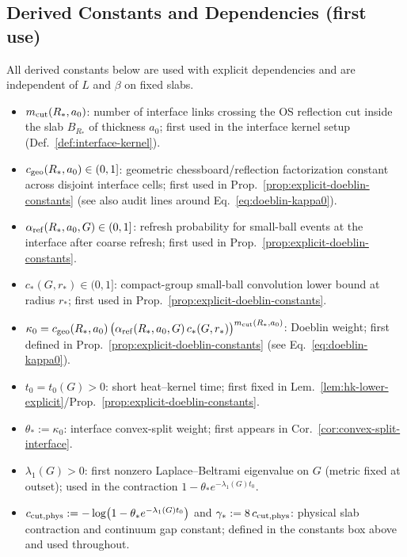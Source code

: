\documentclass[11pt]{amsart}
\theoremstyle{plain}
\theoremstyle{definition}
\theoremstyle{remark}
\begin{document}
\subsection*{Derived Constants and Dependencies (first use)}
All derived constants below are used with explicit dependencies and are independent of $L$ and $\beta$ on fixed slabs.
\begin{itemize}[leftmargin=2em, itemsep=6pt, parsep=3pt]
  \item $m_{\rm cut}(R_*,a_0)$: number of interface links crossing the OS reflection cut inside the slab $B_{R_*}$ of thickness $a_0$; first used in the interface kernel setup (Def.~\ref{def:interface-kernel}).
  \item $c_{\rm geo}(R_*,a_0)\in(0,1]$: geometric chessboard/reflection factorization constant across disjoint interface cells; first used in Prop.~\ref{prop:explicit-doeblin-constants} (see also audit lines around Eq.~\eqref{eq:doeblin-kappa0}).
  \item $\alpha_{\rm ref}(R_*,a_0,G)\in(0,1]$: refresh probability for small-ball events at the interface after coarse refresh; first used in Prop.~\ref{prop:explicit-doeblin-constants}.
  \item $c_*(G,r_*)\in(0,1]$: compact-group small-ball convolution lower bound at radius $r_*$; first used in Prop.~\ref{prop:explicit-doeblin-constants}.
  \item $\kappa_0=c_{\rm geo}(R_*,a_0)\,\big(\alpha_{\rm ref}(R_*,a_0,G)\,c_*(G,r_*)\big)^{m_{\rm cut}(R_*,a_0)}$: Doeblin weight; first defined in Prop.~\ref{prop:explicit-doeblin-constants} (see Eq.~\eqref{eq:doeblin-kappa0}).
  \item $t_0=t_0(G)>0$: short heat--kernel time; first fixed in Lem.~\ref{lem:hk-lower-explicit}/Prop.~\ref{prop:explicit-doeblin-constants}.
  \item $\theta_*:=\kappa_0$: interface convex-split weight; first appears in Cor.~\ref{cor:convex-split-interface}.
  \item $\lambda_1(G)>0$: first nonzero Laplace--Beltrami eigenvalue on $G$ (metric fixed at outset); used in the contraction $1-\theta_* e^{-\lambda_1(G)t_0}$.
  \item $c_{\rm cut,phys}:= -\log\bigl(1-\theta_* e^{-\lambda_1(G) t_0}\bigr)$ and $\gamma_*:=8\,c_{\rm cut,phys}$: physical slab contraction and continuum gap constant; defined in the constants box above and used throughout.
\end{itemize}
\end{document}
